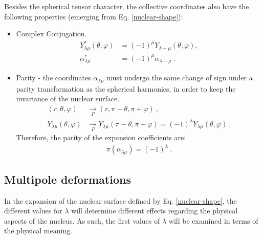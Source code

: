 Besides the spherical tensor character, the collective coordinates also have the following properties (emerging from Eq. \ref{nuclear-shape}):
\begin{itemize}
    \item Complex Conjugation.
    \begin{align}
        Y^*_{\lambda\mu}(\theta,\varphi)&=(-1)^{\mu}Y_{\lambda-\mu}(\theta,\varphi), \\
        \alpha^*_{\lambda\mu}&=(-1)^\mu\alpha_{\lambda-\mu}\ .
    \end{align}
    \item Parity - the coordinates $\alpha_{\lambda\mu}$ must undergo the same change of sign under a parity transformation as the spherical harmonics, in order to keep the invariance of the nuclear surface.
    \begin{align}
        (r,\theta,\varphi) &\xrightarrow[P]{}     (r,\pi-\theta,\pi+\varphi)\ \nonumber, \\
        Y_{\lambda\mu}(\theta,\varphi) &\xrightarrow[P]{} Y_{\lambda\mu}(\pi-\theta,\pi+\varphi)=(-1)^\lambda Y_{\lambda\mu}(\theta,\varphi)\ .\nonumber
    \end{align}
    Therefore, the parity of the expansion coefficients are:
    \begin{align}
        \pi(\alpha_{\lambda\mu})=(-1)^\lambda\ .
    \end{align}
\end{itemize}

\subsection{Multipole deformations}

In the expansion of the nuclear surface defined by Eq. 
\ref{nuclear-shape}, the different values for $\lambda$ will determine different effects regarding the physical aspects of the nucleus. As such, the first values of $\lambda$ will be examined in terms of the physical meaning.

